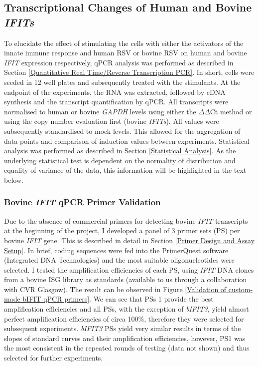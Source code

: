 \subsection{Transcriptional Changes of Human and Bovine \textit{IFITs}} \label{Transcriptional Changes of Human and Bovine \textit{IFITs}}
To elucidate the effect of stimulating the cells with either the activators of the innate immune response and human RSV or bovine RSV on human and bovine \textit{IFIT} expression respectively, qPCR analysis was performed as described in Section \ref{Quantitative Real Time/Reverse Transcription PCR}. In short, cells were seeded in 12 well plates and subsequently treated with the stimulants. At the endpoint of the experiments, the RNA was extracted, followed by cDNA synthesis and the transcript quantification by qPCR. All transcripts were normalised to human or bovine \textit{GAPDH} levels using either the \(\Delta\)\(\Delta\)Ct method or using the copy number evaluation first (bovine \textit{IFITs}). All values were subsequently standardised to mock levels. This allowed for the aggregation of data points and comparison of induction values between experiments. Statistical analysis was performed as described in Section \ref{Statistical Analysis}. As the underlying statistical test is dependent on the normality of distribution and equality of variance of the data, this information will be highlighted in the text below.




\subsubsection{Bovine \textit{IFIT} qPCR Primer Validation} \label{Bovine IFIT qPCR Primer Validation}
Due to the absence of commercial primers for detecting bovine \textit{IFIT} transcripts at the beginning of the project, I developed a panel of 3 primer sets (PS) per bovine \textit{IFIT} gene. This is described in detail in Section \ref{Primer Design and Assay Setup}. In brief, coding sequences were fed into the PrimerQuest software (Integrated DNA Technologies) and the most suitable oligonucleotides were selected. I tested the amplification efficiencies of each PS, using \textit{IFIT} DNA clones from a bovine ISG library as standards (available to us through a collaboration with CVR Glasgow). The result can be observed in Figure \ref{Validation of custom-made bIFIT qPCR primers}. We can see that PSs 1 provide the best amplification efficiencies and all PSs, with the exception of \textit{bIFIT3}, yield almost perfect amplification efficiencies of circa 100\%, therefore they were selected for subsequent experiments. \textit{bIFIT3} PSs yield very similar results in terms of the slopes of standard curves and their amplification efficiencies, however, PS1 was the most consistent in the repeated rounds of testing (data not shown) and thus selected for further experiments. 

